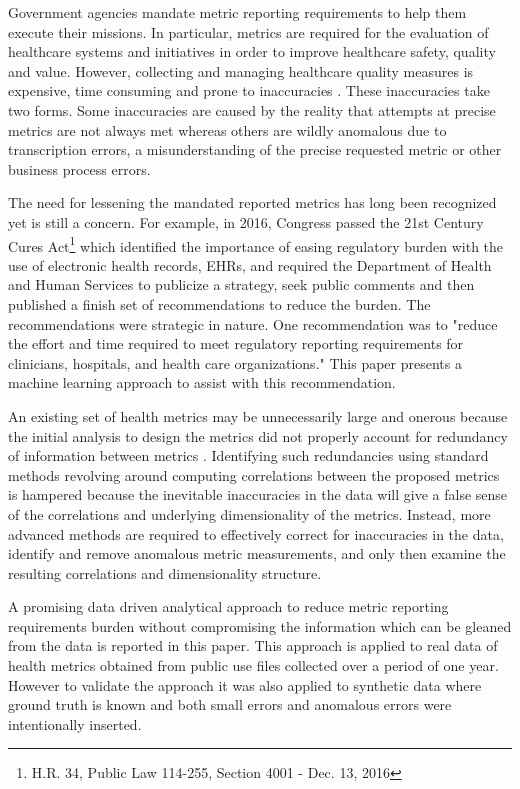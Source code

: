 \documentclass[conference]{IEEEtran}
\begin{document}
Government agencies  mandate  metric reporting requirements to help them execute their missions.  In particular,  metrics are required for the evaluation of healthcare systems and initiatives in order to improve healthcare safety, quality and value. However, collecting and managing healthcare quality measures is expensive,  time consuming and prone to inaccuracies \cite{rao2017impact, cutler2012reducing}.  These inaccuracies take two forms.  Some inaccuracies are caused by the reality that attempts at precise metrics are not always met whereas others are wildly anomalous due to transcription errors, a misunderstanding of the precise requested metric or other business process errors.

The need for lessening the mandated reported metrics has long been recognized yet is still a concern.  For example, in 2016, Congress passed the  21st Century Cures Act\footnote{H.R. 34, Public Law 114-255, Section 4001 - Dec. 13, 2016} which identified the importance of easing regulatory burden with the use of electronic health records, EHRs, and required  the Department of Health and Human Services to publicize a strategy, seek public comments and then published a finish set of recommendations to reduce the burden. \cite{HHS2019str} The recommendations were strategic in nature. One recommendation was to "reduce the effort and time required to meet regulatory reporting requirements for clinicians, hospitals, and health care organizations."  This paper presents a machine learning approach to assist with this recommendation. 


An existing set of health metrics may be unnecessarily large and onerous because the initial analysis to design the metrics did not properly account for redundancy of information between metrics \cite{lesidea1, vostok2013assessment}.
Identifying such redundancies using standard methods revolving around computing correlations between the proposed metrics is hampered because the inevitable inaccuracies in the data will give a false sense of the correlations and underlying dimensionality of the metrics.   Instead, more advanced methods are required to effectively correct for  inaccuracies in the data, identify and remove anomalous metric measurements, and only then examine the resulting correlations and dimensionality structure.

A promising data driven analytical approach to reduce metric reporting requirements burden without compromising the information which can be gleaned from the data is reported in this paper. This approach is applied to real data of  health metrics obtained from public use files collected over a period of one year.  However to validate the approach it was also applied to synthetic data where ground truth is known and both small errors and anomalous errors were intentionally inserted.
\end{document}
